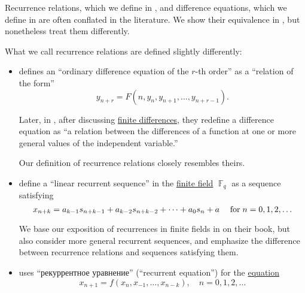 \begin{remark}\label{rem:recurrence_relations_and_difference_equations_literature_overview}
  Recurrence relations, which we define in , and difference equations, which we define in  are often conflated in the literature. We show their equivalence in , but nonetheless treat them differently.

  What we call recurrence relations are defined slightly differently:
  \begin{itemize}
    \item {} defines an \enquote{ordinary difference equation of the \( r \)-th order} as a \enquote{relation of the form}
    \begin{equation*}
      y_{n+r} = F(n, y_n, y_{n+1}, \ldots, y_{n+r-1}).
    \end{equation*}

    Later, in \cite[75]{LevyLessman1961FiniteDifferenceEquations}, after discussing \hyperref[def:finite_difference_operator]{finite differences}, they redefine a difference equation as \enquote{a relation between the differences of a function at one or more general values of the independent variable.}

    Our definition of recurrence relations closely resembles theirs.

    \item {} define a \enquote{linear recurrent sequence} in the \hyperref[def:finite_field]{finite field} \( \BbbF_q \) as a sequence satisfying
    \begin{equation*}
      x_{n+k} = a_{k-1} s_{n+k-1} + a_{k-2} s_{n+k-2} + \cdots + a_0 s_n + a \quad\T{for} n = 0, 1, 2, \ldots
    \end{equation*}

    We base our exposition of recurrences in finite fields in  on their book, but also consider more general recurrent sequences, and emphasize the difference between recurrence relations and sequences satisfying them.

    \item {} uses \enquote{рекуррентное уравнение} (\enquote{recurrent equation}) for the \hyperref[def:equation]{equation}
    \begin{equation*}
      x_{n+1} = f(x_n, x_{-1}, \ldots, x_{n-k}), \quad n = 0, 1, 2, \ldots
    \end{equation*}


\end{itemize}
\end{remark}
